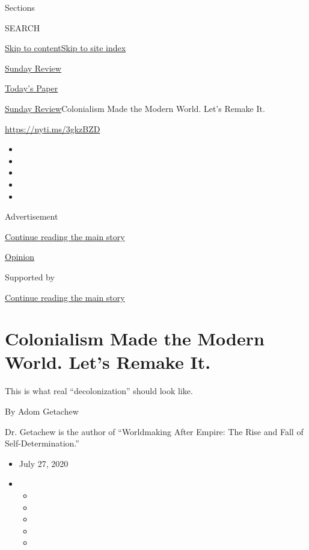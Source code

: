 Sections

SEARCH

\protect\hyperlink{site-content}{Skip to
content}\protect\hyperlink{site-index}{Skip to site index}

\href{https://www.nytimes3xbfgragh.onion/section/opinion/sunday}{Sunday
Review}

\href{https://myaccount.nytimes3xbfgragh.onion/auth/login?response_type=cookie\&client_id=vi}{}

\href{https://www.nytimes3xbfgragh.onion/section/todayspaper}{Today's
Paper}

\href{/section/opinion/sunday}{Sunday Review}\textbar{}Colonialism Made
the Modern World. Let's Remake It.

\url{https://nyti.ms/3gkzBZD}

\begin{itemize}
\item
\item
\item
\item
\item
\end{itemize}

Advertisement

\protect\hyperlink{after-top}{Continue reading the main story}

\href{/section/opinion}{Opinion}

Supported by

\protect\hyperlink{after-sponsor}{Continue reading the main story}

\hypertarget{colonialism-made-the-modern-world-lets-remake-it}{%
\section{Colonialism Made the Modern World. Let's Remake
It.}\label{colonialism-made-the-modern-world-lets-remake-it}}

This is what real ``decolonization'' should look like.

By Adom Getachew

Dr. Getachew is the author of ``Worldmaking After Empire: The Rise and
Fall of Self-Determination.''

\begin{itemize}
\item
  July 27, 2020
\item
  \begin{itemize}
  \item
  \item
  \item
  \item
  \item
  \end{itemize}
\end{itemize}


